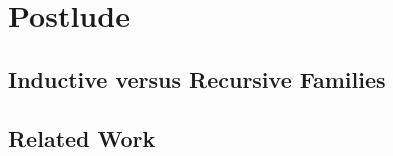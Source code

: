 \documentclass[12pt]{report}
\theoremstyle{definition}
\theoremstyle{remark}
\numberwithin{definition}{section}
\numberwithin{equation}{section}
\numberwithin{proposition}{section}
\numberwithin{conjecture}{section}
\numberwithin{theorem}{section}
\numberwithin{lemma}{section}
\numberwithin{corollary}{section}
\numberwithin{example}{section}
\numberwithin{remark}{section}
\begin{document}




\part{Postlude}\label{part:postlude}
\chapter{Inductive versus Recursive Families}\label{ch:ivsr}
\chapter{Related Work}\label{ch:related}
\end{document}

